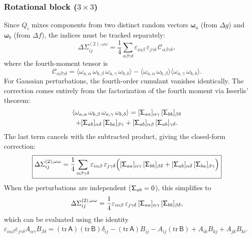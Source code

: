 \documentclass[journal]{IEEEtran}
\newcommand{\bfomega}{\boldsymbol{\omega}}
\newcommand{\sfSigma}[1]{\mathsf{\Sigma}_\mathnormal{#1}}
\newcommand{\beq}{\begin{equation}}
\newcommand{\eeq}{\end{equation}}
\begin{document}
\subsubsection{Rotational block ($3\times 3$)}
Since $Q_i$ mixes components from two distinct random 
vectors $\bfomega_a$ (from $\Delta g$) and $\bfomega_b$ 
(from $\Delta f$), the indices must be tracked separately:
\beq
    \Delta\Sigma^{(2),\omega\omega}_{ij} = \frac{1}{4}
    \sum_{\alpha\beta\gamma\delta}
    \varepsilon_{i\alpha\beta}\,\varepsilon_{j\gamma\delta}\,
    \mathcal{C}_{\alpha\beta\gamma\delta},
    \label{eq:covcorrection_rotrot}
\eeq
where the fourth-moment tensor is
\beq
    \mathcal{C}_{\alpha\beta\gamma\delta} = 
    \langle \omega_{a,\alpha}\,\omega_{b,\beta}\,
    \omega_{a,\gamma}\,\omega_{b,\delta} \rangle
    - \langle \omega_{a,\alpha}\,\omega_{b,\beta} \rangle
    \langle \omega_{a,\gamma}\,\omega_{b,\delta} \rangle.
\eeq
For Gaussian perturbations, the fourth-order cumulant 
vanishes identically. The correction comes entirely from 
the factorization of the fourth moment via Isserlis' theorem:
\begin{multline}
    \langle \omega_{a,\alpha}\,\omega_{b,\beta}\,
    \omega_{a,\gamma}\,\omega_{b,\delta} \rangle = 
    [\sfSigma{aa}]_{\alpha\gamma}\,[\sfSigma{bb}]_{\beta\delta} \\
    + [\sfSigma{ab}]_{\alpha\delta}\,[\sfSigma{ba}]_{\beta\gamma}
    + [\sfSigma{ab}]_{\alpha\beta}\,[\sfSigma{ab}]_{\gamma\delta}.
    \label{eq:isserlis}
\end{multline}
The last term cancels with the subtracted product, giving 
the closed-form correction:
\beq
    \boxed{
    \Delta\Sigma^{(2),\omega\omega}_{ij} = \frac{1}{4}
    \sum_{\alpha\beta\gamma\delta}
    \varepsilon_{i\alpha\beta}\,\varepsilon_{j\gamma\delta}
    \Big([\sfSigma{aa}]_{\alpha\gamma}\,[\sfSigma{bb}]_{\beta\delta}
    + [\sfSigma{ab}]_{\alpha\delta}\,[\sfSigma{ba}]_{\beta\gamma}\Big)
    }
    \label{eq:covcorrection_explicit}
\eeq
When the perturbations are independent ($\sfSigma{ab} = 0$), 
this simplifies to
\beq
    \Delta\Sigma^{(2),\omega\omega}_{ij} = \frac{1}{4}
    \varepsilon_{i\alpha\beta}\,\varepsilon_{j\gamma\delta}\,
    [\sfSigma{aa}]_{\alpha\gamma}\,[\sfSigma{bb}]_{\beta\delta},
\eeq
which can be evaluated using the identity 
$\varepsilon_{i\alpha\beta}\varepsilon_{j\gamma\delta}
A_{\alpha\gamma}B_{\beta\delta} = 
(\mathrm{tr}\,\mathsf{A})(\mathrm{tr}\,\mathsf{B})\delta_{ij}
- (\mathrm{tr}\,\mathsf{A})B_{ij} - A_{ij}(\mathrm{tr}\,\mathsf{B})
+ A_{ik}B_{kj} + A_{jk}B_{ki}$.
\end{document}
